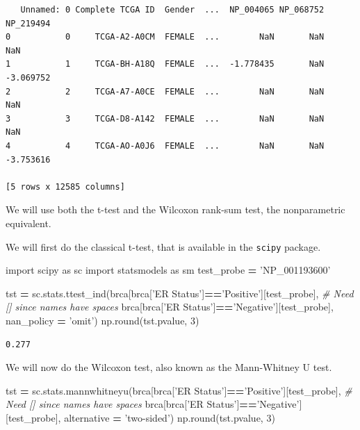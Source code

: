 \documentclass[
  letterpaper,
]{scrbook}
\newenvironment{Shaded}{\begin{snugshade}}{\end{snugshade}}
\newcommand{\BuiltInTok}[1]{#1}
\newcommand{\CommentTok}[1]{\textcolor[rgb]{0.56,0.35,0.01}{\textit{#1}}}
\newcommand{\DecValTok}[1]{\textcolor[rgb]{0.00,0.00,0.81}{#1}}
\newcommand{\ImportTok}[1]{#1}
\newcommand{\NormalTok}[1]{#1}
\newcommand{\OperatorTok}[1]{\textcolor[rgb]{0.81,0.36,0.00}{\textbf{#1}}}
\newcommand{\StringTok}[1]{\textcolor[rgb]{0.31,0.60,0.02}{#1}}
\begin{document}
\begin{verbatim}
   Unnamed: 0 Complete TCGA ID  Gender  ...  NP_004065 NP_068752 NP_219494
0           0     TCGA-A2-A0CM  FEMALE  ...        NaN       NaN       NaN
1           1     TCGA-BH-A18Q  FEMALE  ...  -1.778435       NaN -3.069752
2           2     TCGA-A7-A0CE  FEMALE  ...        NaN       NaN       NaN
3           3     TCGA-D8-A142  FEMALE  ...        NaN       NaN       NaN
4           4     TCGA-AO-A0J6  FEMALE  ...        NaN       NaN -3.753616

[5 rows x 12585 columns]
\end{verbatim}

We will use both the t-test and the Wilcoxon rank-sum test, the nonparametric equivalent.

We will first do the classical t-test, that is available in the \texttt{scipy} package.

\begin{Shaded}
\begin{Highlighting}[]
\ImportTok{import}\NormalTok{ scipy }\ImportTok{as}\NormalTok{ sc}
\ImportTok{import}\NormalTok{ statsmodels }\ImportTok{as}\NormalTok{ sm}
\NormalTok{test_probe }\OperatorTok{=} \StringTok{'NP_001193600'}

\NormalTok{tst }\OperatorTok{=}\NormalTok{ sc.stats.ttest_ind(brca[brca[}\StringTok{'ER Status'}\NormalTok{]}\OperatorTok{==}\StringTok{'Positive'}\NormalTok{][test_probe], }\CommentTok{# Need [] since names have spaces}
\NormalTok{                   brca[brca[}\StringTok{'ER Status'}\NormalTok{]}\OperatorTok{==}\StringTok{'Negative'}\NormalTok{][test_probe], }
\NormalTok{                  nan_policy }\OperatorTok{=} \StringTok{'omit'}\NormalTok{)}
\NormalTok{np.}\BuiltInTok{round}\NormalTok{(tst.pvalue, }\DecValTok{3}\NormalTok{)}
\end{Highlighting}
\end{Shaded}

\begin{verbatim}
0.277
\end{verbatim}

We will now do the Wilcoxon test, also known as the Mann-Whitney U test.

\begin{Shaded}
\begin{Highlighting}[]
\NormalTok{tst }\OperatorTok{=}\NormalTok{ sc.stats.mannwhitneyu(brca[brca[}\StringTok{'ER Status'}\NormalTok{]}\OperatorTok{==}\StringTok{'Positive'}\NormalTok{][test_probe], }\CommentTok{# Need [] since names have spaces}
\NormalTok{                   brca[brca[}\StringTok{'ER Status'}\NormalTok{]}\OperatorTok{==}\StringTok{'Negative'}\NormalTok{][test_probe], }
\NormalTok{                  alternative }\OperatorTok{=} \StringTok{'two-sided'}\NormalTok{)}
\NormalTok{np.}\BuiltInTok{round}\NormalTok{(tst.pvalue, }\DecValTok{3}\NormalTok{)}
\end{Highlighting}
\end{Shaded}
\end{document}
